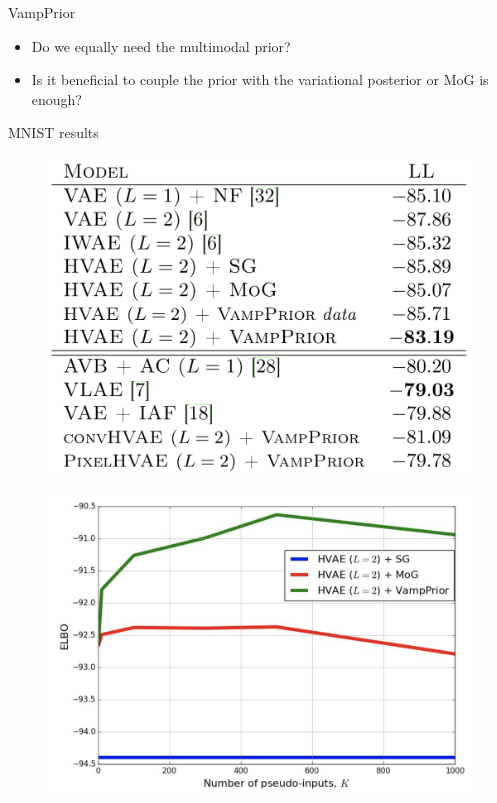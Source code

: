 \begin{frame}{VampPrior}
	\begin{itemize}
	\item Do we equally need the multimodal prior?
	\item Is it beneficial to couple the prior with the variational posterior or MoG is enough?
	\end{itemize}
	\begin{block}{MNIST results}
		\begin{minipage}[t]{0.5\columnwidth}
			\begin{figure}[h]
				\centering
				\includegraphics[width=0.9\linewidth]{figs/VampPrior_1.png}
			\end{figure}
		\end{minipage}%
		\begin{minipage}[t]{0.5\columnwidth}
			\begin{figure}[h]
				\centering
				\includegraphics[width=1.\linewidth]{figs/VampPrior_2.png}
			\end{figure}
		\end{minipage}
	\end{block}
\end{frame}
